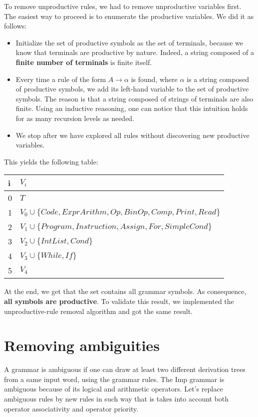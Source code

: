 \documentclass[12pt]{report}
\begin{document}
To remove unproductive rules, we had to remove unproductive variables first. The easiest way to proceed is to enumerate the productive variables.
We did it as follows:
\begin{itemize}
  \item Initialize the set of productive symbols as the set of terminals, because we know that terminals are productive by nature. Indeed, 
  a string composed of a \textbf{finite number of terminals} is finite itself.
  \item Every time a rule of the form $A \rightarrow \alpha$ is found, where $\alpha$ is a string composed of productive symbols, we add its left-hand 
  variable to the set of productive symbols. The reason is that a string composed of strings of terminals are also finite. Using an inductive reasoning, 
  one can notice that this intuition holds for as many recursion levels as needed.
  \item We stop after we have explored all rules without discovering new productive variables.
\end{itemize}
This yields the following table:

\begin{tabular}{|l p{35em}|} \hline
   i & $V_i$ \\ \hline
  0 & $T$ \\ \hline
  1 & $V_0 \cup \{Code, ExprArithm, Op, BinOp, Comp, Print, Read\}$ \\ \hline
  2 & $V_1 \cup \{Program, Instruction, Assign, For, SimpleCond\}$ \\ \hline
  3 & $V_2 \cup \{IntList, Cond\}$ \\ \hline
  4 & $V_3 \cup \{While, If\}$ \\ \hline
  5 & $V_4$ \\ \hline
\end{tabular}

At the end, we get that the set contains all grammar symbols. As consequence, \textbf{all symbols are productive}. To validate this result, we implemented
the unproductive-rule removal algorithm and got the same result.

\section{Removing ambiguities}

A grammar is ambiguous if one can draw at least two different derivation trees from a same input word, using the grammar rules.
The Imp grammar is ambiguous because of its logical and arithmetic operators. Let's replace ambiguous rules by new rules in such way
that is takes into account both operator associativity and operator priority.
\end{document}
